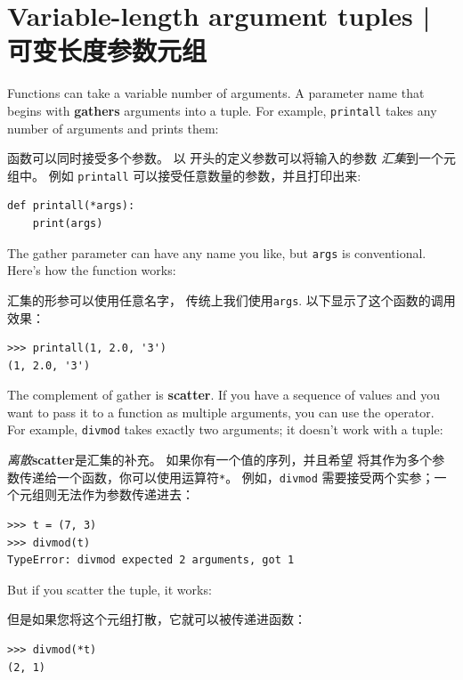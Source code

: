 \section{Variable-length argument tuples | 可变长度参数元组}
\label{gather}
 
  

Functions can take a variable number of arguments.  A parameter
name that begins with {\tt *} {\bf gathers} arguments into
a tuple.  For example, {\tt printall}
takes any number of arguments and prints them:

函数可以同时接受多个参数。 以 {\bf *} 开头的定义参数可以将输入的参数 \emph{汇集}到一个元组中。 例如 \lstinline{printall} 可以接受任意数量的参数，并且打印出来:

\begin{lstlisting}
def printall(*args):
    print(args)
\end{lstlisting}
%
The gather parameter can have any name you like, but {\tt args} is
conventional.  Here's how the function works:

汇集的形参可以使用任意名字， 传统上我们使用\lstinline{args}. 以下显示了这个函数的调用效果：

\begin{lstlisting}
>>> printall(1, 2.0, '3')
(1, 2.0, '3')
\end{lstlisting}
%
The complement of gather is {\bf scatter}.  If you have a
sequence of values and you want to pass it to a function
as multiple arguments, you can use the {\tt *} operator.
For example, {\tt divmod} takes exactly two arguments; it
doesn't work with a tuple:

\emph{离散}{\bf scatter}是汇集的补充。 如果你有一个值的序列，并且希望
将其作为多个参数传递给一个函数，你可以使用运算符\lstinline{*}。
例如，\lstinline{divmod} 需要接受两个实参；一个元组则无法作为参数传递进去：

  

\begin{lstlisting}
>>> t = (7, 3)
>>> divmod(t)
TypeError: divmod expected 2 arguments, got 1
\end{lstlisting}
%
But if you scatter the tuple, it works:

但是如果您将这个元组打散，它就可以被传递进函数：

\begin{lstlisting}
>>> divmod(*t)
(2, 1)
\end{lstlisting}


